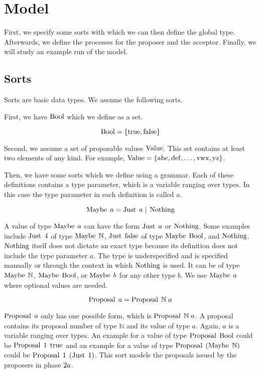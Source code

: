 \chapter{Model}
First, we specify some sorts with which we can then define the global type.
Afterwards, we define the processes for the proposer and the acceptor.
Finally, we will study an example run of the model.

\section{Sorts}
Sorts are basic data types.
We assume the following sorts.

First, we have $\operatorname{Bool}$ which we define as a set.

\[\operatorname{Bool} = \left\{\operatorname{true}, \operatorname{false}\right\}\]

Second, we assume a set of proposable values $\operatorname{Value}$.
This set contains at least two elements of any kind.
For example, $\operatorname{Value}=\left\{\operatorname{abc}, \operatorname{def}, \dots, \operatorname{vwx}, \operatorname{yz}\right\}$.

Then, we have some sorts which we define using a grammar.
Each of these definitions contains a type parameter, which is a variable ranging over types.
In this case the type parameter in each definition is called $a$.

\[\operatorname{Maybe}\; a = \operatorname{Just}\; a \; | \; \operatorname{Nothing}\]

A value of type $\operatorname{Maybe}\; a$ can have the form $\operatorname{Just}\; a$ or $\operatorname{Nothing}$.
Some examples include $\operatorname{Just}\; 4$ of type $\operatorname{Maybe}\; \mathbb{N}$, $\operatorname{Just}\; \operatorname{false}$ of type $\operatorname{Maybe}\; \operatorname{Bool}$, and $\operatorname{Nothing}$.
$\operatorname{Nothing}$ itself does not dictate an exact type because its definition does not include the type parameter $a$.
The type is underspecified and is specified manually or through the context in which $\operatorname{Nothing}$ is used.
It can be of type $\operatorname{Maybe}\; \mathbb{N}$, $\operatorname{Maybe}\; \operatorname{Bool}$, or $\operatorname{Maybe}\; b$ for any other type $b$.
We use $\operatorname{Maybe}\; a$ where optional values are needed.

\[\operatorname{Proposal}\; a = \operatorname{Proposal}\; \mathbb{N}\; a\]

$\operatorname{Proposal}\; a$ only has one possible form, which is $\operatorname{Proposal}\; \mathbb{N}\; a$.
A proposal contains its proposal number of type $\mathbb{N}$ and its value of type $a$.
Again, $a$ is a variable ranging over types.
An example for a value of type $\operatorname{Proposal}\; \operatorname{Bool}$ could be $\operatorname{Proposal}\; 1\; \operatorname{true}$ and an example for a value of type $\operatorname{Proposal}\; \left(\operatorname{Maybe}\; \mathbb{N}\right)$ could be $\operatorname{Proposal}\; 1\; \left(\operatorname{Just}\; 1\right)$.
This sort models the proposals issued by the proposers in phase $2a$.

